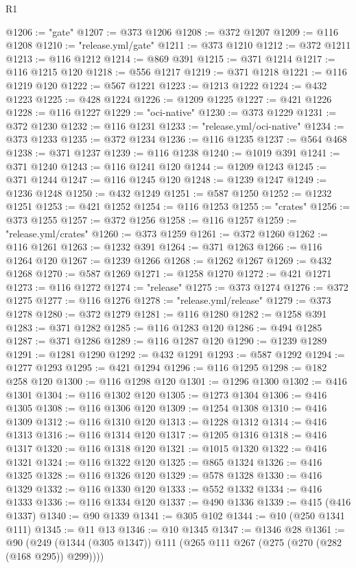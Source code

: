\begin{lexlean}{R1}
\begin{coremodule}
@1206 := "gate"
@1207 := @373 @1206
@1208 := @372 @1207
@1209 := @116 @1208
@1210 := "release.yml/gate"
@1211 := @373 @1210
@1212 := @372 @1211
@1213 := @116 @1212
@1214 := @869 @391
@1215 := @371 @1214
@1217 := @116 @1215 @120
@1218 := @556 @1217
@1219 := @371 @1218
@1221 := @116 @1219 @120
@1222 := @567 @1221
@1223 := @1213 @1222
@1224 := @432 @1223
@1225 := @428 @1224
@1226 := @1209 @1225
@1227 := @421 @1226
@1228 := @116 @1227
@1229 := "oci-native"
@1230 := @373 @1229
@1231 := @372 @1230
@1232 := @116 @1231
@1233 := "release.yml/oci-native"
@1234 := @373 @1233
@1235 := @372 @1234
@1236 := @116 @1235
@1237 := @564 @468
@1238 := @371 @1237
@1239 := @116 @1238
@1240 := @1019 @391
@1241 := @371 @1240
@1243 := @116 @1241 @120
@1244 := @1209 @1243
@1245 := @371 @1244
@1247 := @116 @1245 @120
@1248 := @1239 @1247
@1249 := @1236 @1248
@1250 := @432 @1249
@1251 := @587 @1250
@1252 := @1232 @1251
@1253 := @421 @1252
@1254 := @116 @1253
@1255 := "crates"
@1256 := @373 @1255
@1257 := @372 @1256
@1258 := @116 @1257
@1259 := "release.yml/crates"
@1260 := @373 @1259
@1261 := @372 @1260
@1262 := @116 @1261
@1263 := @1232 @391
@1264 := @371 @1263
@1266 := @116 @1264 @120
@1267 := @1239 @1266
@1268 := @1262 @1267
@1269 := @432 @1268
@1270 := @587 @1269
@1271 := @1258 @1270
@1272 := @421 @1271
@1273 := @116 @1272
@1274 := "release"
@1275 := @373 @1274
@1276 := @372 @1275
@1277 := @116 @1276
@1278 := "release.yml/release"
@1279 := @373 @1278
@1280 := @372 @1279
@1281 := @116 @1280
@1282 := @1258 @391
@1283 := @371 @1282
@1285 := @116 @1283 @120
@1286 := @494 @1285
@1287 := @371 @1286
@1289 := @116 @1287 @120
@1290 := @1239 @1289
@1291 := @1281 @1290
@1292 := @432 @1291
@1293 := @587 @1292
@1294 := @1277 @1293
@1295 := @421 @1294
@1296 := @116 @1295
@1298 := @182 @258 @120
@1300 := @116 @1298 @120
@1301 := @1296 @1300
@1302 := @416 @1301
@1304 := @116 @1302 @120
@1305 := @1273 @1304
@1306 := @416 @1305
@1308 := @116 @1306 @120
@1309 := @1254 @1308
@1310 := @416 @1309
@1312 := @116 @1310 @120
@1313 := @1228 @1312
@1314 := @416 @1313
@1316 := @116 @1314 @120
@1317 := @1205 @1316
@1318 := @416 @1317
@1320 := @116 @1318 @120
@1321 := @1015 @1320
@1322 := @416 @1321
@1324 := @116 @1322 @120
@1325 := @865 @1324
@1326 := @416 @1325
@1328 := @116 @1326 @120
@1329 := @578 @1328
@1330 := @416 @1329
@1332 := @116 @1330 @120
@1333 := @552 @1332
@1334 := @416 @1333
@1336 := @116 @1334 @120
@1337 := @490 @1336
@1339 := @415 (@416 @1337)
@1340 := @90 @1339
@1341 := @305 @102
@1344 := @10 (@250 @1341 @111)
@1345 := @11 @13
@1346 := @10 @1345
@1347 := @1346 @28
@1361 := @90 (@249 (@1344 (@305 @1347)) @111 (@265 @111 @267 (@275 (@270 (@282 (@168 @295)) @299))))

\end{coremodule}
\end{lexlean}
